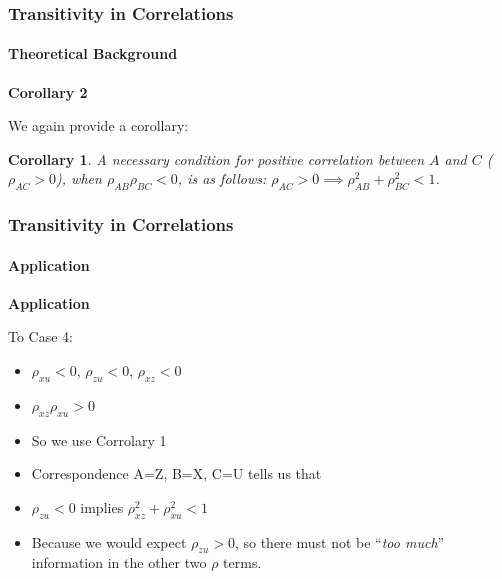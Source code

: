 \documentclass{beamer}
\newtheorem{coro}{Corollary}
\begin{document}
\begin{frame}
\frametitle{Transitivity in Correlations}
\framesubtitle{Theoretical Background}
\textbf{Corollary 2} \\ \bigskip \pause

We again provide a corollary: \bigskip \pause 

\begin{coro} \label{coro:trans_2}
A necessary condition for positive correlation between $A$ and $C$ ($\rho_{AC}>0$), when $\rho_{AB}\rho_{BC}<0$, is as follows: $\rho_{AC} >0 \implies \rho_{AB}^2+\rho_{BC}^2 < 1$. 
\end{coro}

\end{frame}

\begin{frame}
\frametitle{Transitivity in Correlations}
\framesubtitle{Application}
\textbf{Application} \\ \bigskip \pause

To Case 4: \pause

\begin{itemize}
  \item $\rho_{xu}<0$, $\rho_{zu}<0$, $\rho_{xz}<0$ \pause
  \item $\rho_{xz}\rho_{xu}>0$ \pause
  \item So we use Corrolary 1  \pause
  \item Correspondence A=Z, B=X, C=U tells us that  \pause
  \item $\rho_{zu}<0$ \pause implies $\rho_{xz}^2+\rho_{xu}^2<1$ \pause
  \item Because we would expect $\rho_{zu}>0$, so there must not be ``\emph{too much}'' information in the other two $\rho$ terms.
\end{itemize}

\end{frame}
\end{document}
